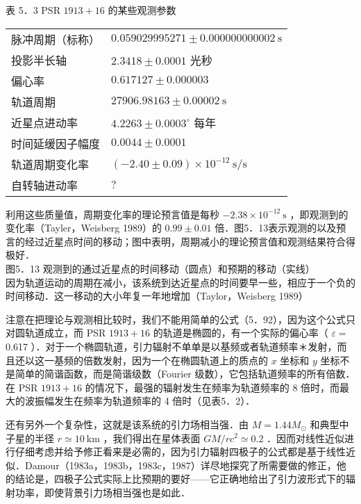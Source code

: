 表 5．3 PSR $1913+16$ 的某些观测参数

\begin{center}
	\begin{tabular}{ll}
		\hline
		脉冲周期（标称） & $0.059029995271 \pm 0.000000000002 \mathrm{~s}$ \\
		投影半长轴 & $2.3418 \pm 0.0001$ 光秒 \\
		偏心率 & $0.617127 \pm 0.000003$ \\
		轨道周期 & $27906.98163 \pm 0.00002 \mathrm{~s}$ \\
		近星点进动率 & $4.2263 \pm 0.0003^{\circ}$ 每年 \\
		时间延缓因子幅度 & $0.0044 \pm 0.0001$ \\
		轨道周期变化率 & $(-2.40 \pm 0.09) \times 10^{-12} \mathrm{~s} / \mathrm{s}$ \\
		自转轴进动率 & $?$ \\
		\hline
	\end{tabular}
\end{center}

利用这些质量值，周期变化率的理论预言值是每秒 $-2.38 \times 10^{-12} \mathrm{~s}$ ，即观测到的变化率（Tayler，Weisberg 1989）的 $0.99 \pm 0.01$ 倍．图5．13表示观测的以及预言的经过近星点时间的移动；图中表明，周期减小的理论预言值和观测结果符合得极好．\\


图5．13 观测到的通过近星点的时间移动（圆点）和预期的移动（实线）\\
因为轨道运动的周期在减小，该系统到达近星点的时间要早一些，相应于一个负的时间移动．这一移动的大小年复一年地增加（Taylor，Weisberg 1989）

注意在把理论与观测相比较时，我们不能用简单的公式（5．92），因为这个公式只对圆轨道成立，而 PSR $1913+16$ 的轨道是椭圆的，有一个实际的偏心率（ $\varepsilon=$ 0.617 ）．对于一个椭圆轨道，引力辐射不单单是以基频或者轨道频率＊发射，而且还以这一基频的倍数发射，因为一个在椭圆轨道上的质点的 $x$ 坐标和 $y$ 坐标不是简单的简谐函数，而是简谐级数（Fourier 级数），它包括轨道频率的所有倍数．在 PSR $1913+16$ 的情况下，最强的辐射发生在频率为轨道频率的 8 倍时，而最大的波振幅发生在频率为轨道频率的 4 倍时（见表5．2）．

还有另外一个复杂性，这就是该系统的引力场相当强．由 $M=1.44 M_{\odot}$ 和典型中子星的半径 $r \simeq 10 \mathrm{~km}$ ，我们得出在星体表面 $G M / r c^{2} \simeq 0.2$ ．因而对线性近似进行仔细考虑并给予修正看来是必需的，因为引力辐射四极子的公式都是基于线性近似．Damour（1983a，1983b，1983c，1987）详尽地探究了所需要做的修正，他的结论是，四极子公式实际上比预期的要好——它正确地给出了引力波形式下的辐射功率，即使背景引力场相当强也是如此．

